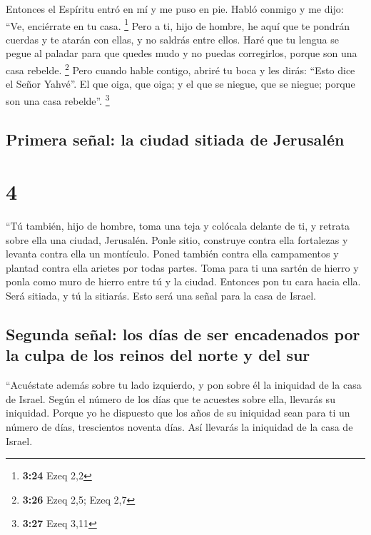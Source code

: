  Entonces el Espíritu entró en mí y me puso en pie. Habló
conmigo y me dijo: ``Ve, enciérrate en tu casa. \footnote{\textbf{3:24}
  Ezeq 2,2}  Pero a ti, hijo de hombre, he aquí que te
pondrán cuerdas y te atarán con ellas, y no saldrás entre ellos.
 Haré que tu lengua se pegue al paladar para que quedes
mudo y no puedas corregirlos, porque son una casa rebelde. \footnote{\textbf{3:26}
  Ezeq 2,5; Ezeq 2,7}  Pero cuando hable contigo, abriré
tu boca y les dirás: ``Esto dice el Señor Yahvé''. El que oiga, que
oiga; y el que se niegue, que se niegue; porque son una casa rebelde''.
\footnote{\textbf{3:27} Ezeq 3,11}

\hypertarget{primera-seuxf1al-la-ciudad-sitiada-de-jerusaluxe9n}{%
\subsection{Primera señal: la ciudad sitiada de
Jerusalén}\label{primera-seuxf1al-la-ciudad-sitiada-de-jerusaluxe9n}}

\hypertarget{section-3}{%
\section{4}\label{section-3}}

 ``Tú también, hijo de hombre, toma una teja y colócala
delante de ti, y retrata sobre ella una ciudad, Jerusalén.
 Ponle sitio, construye contra ella fortalezas y levanta
contra ella un montículo. Poned también contra ella campamentos y
plantad contra ella arietes por todas partes.  Toma para
ti una sartén de hierro y ponla como muro de hierro entre tú y la
ciudad. Entonces pon tu cara hacia ella. Será sitiada, y tú la sitiarás.
Esto será una señal para la casa de Israel.

\hypertarget{segunda-seuxf1al-los-duxedas-de-ser-encadenados-por-la-culpa-de-los-reinos-del-norte-y-del-sur}{%
\subsection{Segunda señal: los días de ser encadenados por la culpa de
los reinos del norte y del
sur}\label{segunda-seuxf1al-los-duxedas-de-ser-encadenados-por-la-culpa-de-los-reinos-del-norte-y-del-sur}}

 ``Acuéstate además sobre tu lado izquierdo, y pon sobre
él la iniquidad de la casa de Israel. Según el número de los días que te
acuestes sobre ella, llevarás su iniquidad.  Porque yo he
dispuesto que los años de su iniquidad sean para ti un número de días,
trescientos noventa días. Así llevarás la iniquidad de la casa de
Israel.

